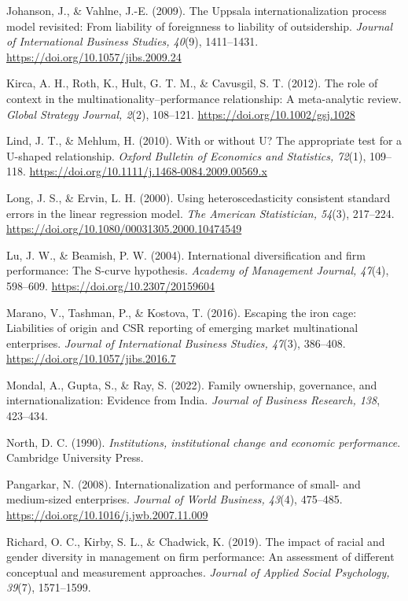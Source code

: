 \documentclass[12pt,a4paper]{article}
\begin{document}
Johanson, J., \& Vahlne, J.-E. (2009). The Uppsala internationalization
process model revisited: From liability of foreignness to liability of
outsidership. \emph{Journal of International Business Studies, 40}(9),
1411--1431. \url{https://doi.org/10.1057/jibs.2009.24}

Kirca, A. H., Roth, K., Hult, G. T. M., \& Cavusgil, S. T. (2012). The
role of context in the multinationality--performance relationship: A
meta-analytic review. \emph{Global Strategy Journal, 2}(2), 108--121.
\url{https://doi.org/10.1002/gsj.1028}

Lind, J. T., \& Mehlum, H. (2010). With or without U? The appropriate
test for a U-shaped relationship. \emph{Oxford Bulletin of Economics and
Statistics, 72}(1), 109--118.
\url{https://doi.org/10.1111/j.1468-0084.2009.00569.x}

Long, J. S., \& Ervin, L. H. (2000). Using heteroscedasticity consistent
standard errors in the linear regression model. \emph{The American
Statistician, 54}(3), 217--224.
\url{https://doi.org/10.1080/00031305.2000.10474549}

Lu, J. W., \& Beamish, P. W. (2004). International diversification and
firm performance: The S-curve hypothesis. \emph{Academy of Management
Journal, 47}(4), 598--609. \url{https://doi.org/10.2307/20159604}

Marano, V., Tashman, P., \& Kostova, T. (2016). Escaping the iron cage:
Liabilities of origin and CSR reporting of emerging market multinational
enterprises. \emph{Journal of International Business Studies, 47}(3),
386--408. \url{https://doi.org/10.1057/jibs.2016.7}

Mondal, A., Gupta, S., \& Ray, S. (2022). Family ownership, governance,
and internationalization: Evidence from India. \emph{Journal of Business
Research, 138}, 423--434.

North, D. C. (1990). \emph{Institutions, institutional change and
economic performance}. Cambridge University Press.

Pangarkar, N. (2008). Internationalization and performance of small- and
medium-sized enterprises. \emph{Journal of World Business, 43}(4),
475--485. \url{https://doi.org/10.1016/j.jwb.2007.11.009}

Richard, O. C., Kirby, S. L., \& Chadwick, K. (2019). The impact of
racial and gender diversity in management on firm performance: An
assessment of different conceptual and measurement approaches.
\emph{Journal of Applied Social Psychology, 39}(7), 1571--1599.
\end{document}
